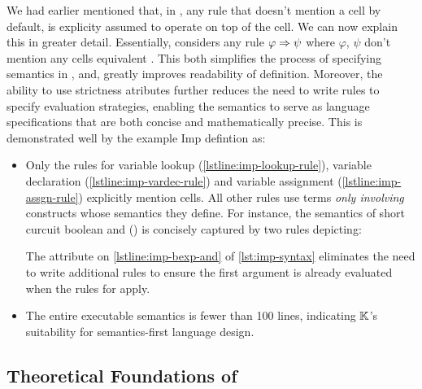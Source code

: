 We had earlier mentioned that, in \K{},
any rule that doesn't mention
a cell by default, is explicity assumed to operate on top
of the  cell. We can now explain this in greater
detail. Essentially, \K{} considers any rule $\varphi \Rightarrow \psi$
where $\varphi$, $\psi$ don't mention any cells equivalent
.
This both simplifies the process of specifying semantics in \K{}, and,
greatly improves readability of \K{} definition. Moreover, the
ability to use strictness atributes further reduces the
need to write rules to specify evaluation strategies, enabling
the semantics to serve as language specifications that are both
concise and mathematically precise. This is demonstrated well
by the example Imp defintion as:
\begin{itemize}
  \item Only the rules for variable lookup (\autoref{lstline:imp-lookup-rule}),
    variable declaration (\autoref{lstline:imp-vardec-rule}) and
    variable assignment (\autoref{lstline:imp-assgn-rule}) explicitly
    mention cells. All other rules use terms \emph{only involving} constructs
    whose semantics they define. For instance, the semantics of
    short curcuit boolean and (\inlinek{&&}) is concisely captured
    by two rules depicting:
    The  attribute
    on \autoref{lstline:imp-bexp-and} of \autoref{lst:imp-syntax}
    eliminates the need to write additional rules to ensure the
    first argument is already evaluated when the rules for
    \inlinek{&&} apply.
  \item The entire executable semantics is fewer than 100 lines,
    indicating $\mathbb{K}{}$'s suitability for semantics-first language design.
\end{itemize}

\subsection{Theoretical Foundations of \K{}}

